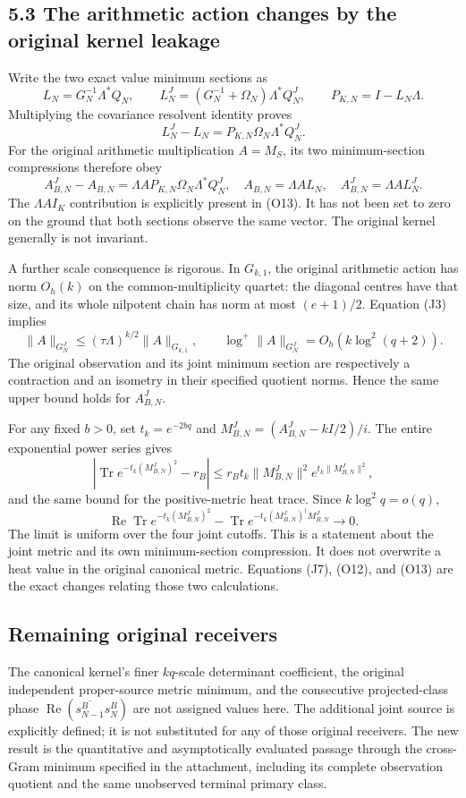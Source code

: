 \subsection{5.3 The arithmetic action changes by the original kernel leakage}\label{the-arithmetic-action-changes-by-the-original-kernel-leakage}

Write the two exact value minimum sections as \[
 L_N=G_N^{-1}\Lambda^*Q_N,\qquad
 L_N^J=(G_N^{-1}+\Omega_N)\Lambda^*Q_N^J,\qquad
 P_{K,N}=I-L_N\Lambda.
\] Multiplying the covariance resolvent identity proves \[
 \boxed{
 L_N^J-L_N=P_{K,N}\Omega_N\Lambda^*Q_N^J.
 } \tag{O12}
\] For the original arithmetic multiplication \(A=M_S\), its two minimum-section compressions therefore obey \[
 \boxed{
 A_{B,N}^J-A_{B,N}
 =\Lambda A P_{K,N}\Omega_N\Lambda^*Q_N^J,
 \quad A_{B,N}=\Lambda A L_N,\quad A_{B,N}^J=\Lambda A L_N^J.
 } \tag{O13}
\] The \(\Lambda A I_K\) contribution is explicitly present in (O13). It has not been set to zero on the ground that both sections observe the same vector. The original kernel generally is not invariant.

A further scale consequence is rigorous. In \(G_{k,1}\), the original arithmetic action has norm \(O_h(k)\) on the common-multiplicity quartet: the diagonal centres have that size, and its whole nilpotent chain has norm at most \((e+1)/2\). Equation (J3) implies \[
 \|A\|_{G_N^J}
 \le(\tau\Lambda)^{k/2}\|A\|_{G_{k,1}},
 \qquad
 \log^+\|A\|_{G_N^J}=O_h(k\log^2(q+2)).
 \tag{O14}
\] The original observation and its joint minimum section are respectively a contraction and an isometry in their specified quotient norms. Hence the same upper bound holds for \(A_{B,N}^J\).

For any fixed \(b>0\), set \(t_k=e^{-2bq}\) and \(M_{B,N}^J=(A_{B,N}^J-kI/2)/i\). The entire exponential power series gives \[
 |\operatorname{Tr}e^{-t_k(M_{B,N}^J)^2}-r_B|
 \le r_B t_k\|M_{B,N}^J\|^2
       e^{t_k\|M_{B,N}^J\|^2},
\] and the same bound for the positive-metric heat trace. Since \(k\log^2q=o(q)\), \[
 \operatorname{Re}\operatorname{Tr}e^{-t_k(M_{B,N}^J)^2}
 -\operatorname{Tr}e^{-t_k(M_{B,N}^J)^\dagger M_{B,N}^J}
 \longrightarrow0. \tag{O15}
\] The limit is uniform over the four joint cutoffs. This is a statement about the joint metric and its own minimum-section compression. It does not overwrite a heat value in the original canonical metric. Equations (J7), (O12), and (O13) are the exact changes relating those two calculations.

\subsection{Remaining original receivers}\label{remaining-original-receivers}

The canonical kernel's finer \(kq\)-scale determinant coefficient, the original independent proper-source metric minimum, and the consecutive projected-class phase \(\operatorname{Re}(\overline{s_{N-1}^B}s_N^B)\) are not assigned values here. The additional joint source is explicitly defined; it is not substituted for any of those original receivers. The new result is the quantitative and asymptotically evaluated passage through the cross-Gram minimum specified in the attachment, including its complete observation quotient and the same unobserved terminal primary class.
